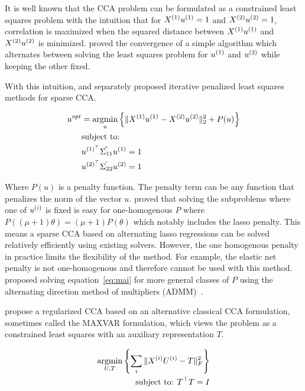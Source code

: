 It is well known that the CCA problem can be formulated as a constrained least squares problem with the intuition that
for \(X^{(1)} u^{(1)}=1\) and \(X^{(2)} u^{(2)}=1\), correlation is maximized when the squared distance
between \(X^{(1)} u^{(1)}\) and \(X^{(2)} u^{(2)}\) is minimized. \citep{golub1995canonical} proved the
convergence of a simple algorithm which alternates between solving the least squares problem for \(u^{(1)}\) and
\(u^{(2)}\) while keeping the other fixed.

With this intuition, \cite{wilms2015sparse} and \cite{mai2019iterative} separately proposed iterative penalized least
squares methods for sparse CCA\@.

\begin{align}
    \label{eq:mai}
    u^{opt} &= \underset{u}{\mathrm{argmin}} \left\{ \|X^{(1)}u^{(1)} - X^{(2)}u^{(2)}\|_2^2 + P(u) \right\} \\
    &\text{subject to:} \notag \\
    &u^{(1)^{\top}} \hat{\Sigma_{11}} u^{(1)}=1 \notag \\
    &u^{(2)^{\top}} \hat{\Sigma_{22}} u^{(2)}=1 \notag
\end{align}

Where \(P(u)\) is a penalty function.
The penalty term can be any function that penalizes the norm of the vector \(u\).
\citep{mai2019iterative} proved that solving the subproblems where one of $u^{(i)}$ is fixed is easy for one-homogenous $P$ where
\( P((\mu + 1)\theta) = (\mu + 1)P(\theta) \) which notably includes the lasso penalty.
This means a sparse CCA based
on alternating lasso regressions can be solved relatively efficiently using existing solvers.
However, the one homogenous penalty in practice limits the flexibility of the method.
For example, the elastic net penalty is not one-homogenous and therefore cannot be used with this method.\citep{
    kanatsoulis2018structured} proposed solving equation~\ref{eq:mai} for more general classes of $P$ using the
alternating direction method of multipliers (ADMM)~\citep{boyd2011distributed}.

\cite{fu2017scalable} propose a regularized CCA based on an alternative classical CCA formulation, sometimes called the MAXVAR formulation, which views the problem as a constrained least squares with an auxiliary representation $T$\citep{carroll1968generalization,kettenring1971canonical}.

\begin{align}\label{eq:fu}
    \underset{U, T}{\mathrm{argmin}}\left\{\sum_i \|X^{(i)} U^{(i)} - T\|_F^2\right\}\\
    \text{subject to: }T^\top T = I\\
\end{align}

